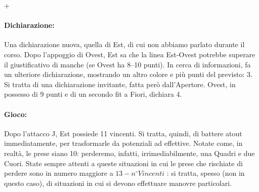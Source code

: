 \documentclass[a4paper,italian,12pt]{article}
\newcommand\cu{Cuori\xspace}
\newcommand\qu{Quadri\xspace}
\newcommand\fio{Fiori\xspace}
\begin{document}
    \showAll*+

\paragraph{Dichiarazione:} Una dichiarazione nuova, quella di Est, di cui non abbiamo parlato durante il corso. Dopo
l'appoggio di Ovest, Est sa che la linea Est-Ovest potrebbe superare il giustificativo di manche (se Ovest ha 8--10
punti). In cerca di informazioni, fa un ulteriore dichiarazione, mostrando un altro colore e più punti del previsto:
3\Cl. Si tratta di una dichiarazione invitante, fatta però dall'Apertore. Ovest, in possesso di 9 punti e di un secondo
fit a \fio, dichiara 4\He.


\paragraph{Gioco:} Dopo l'attacco J\Di, Est possiede 11 vincenti. Si tratta, quindi, di battere atout immediatamente,
per trasformarle da potenziali ad effettive. Notate come, in realtà, le prese siano 10: perderemo, infatti,
irrimediabilmente, una \qu e due \cu. State sempre attenti a queste situazioni in cui le prese che rischiate di perdere
sono in numero maggiore a $13 - \mathit{n^{\circ} Vincenti}$ : si tratta, spesso (non in questo caso), di
situazioni in cui si devono effettuare manovre particolari.
\end{document}
